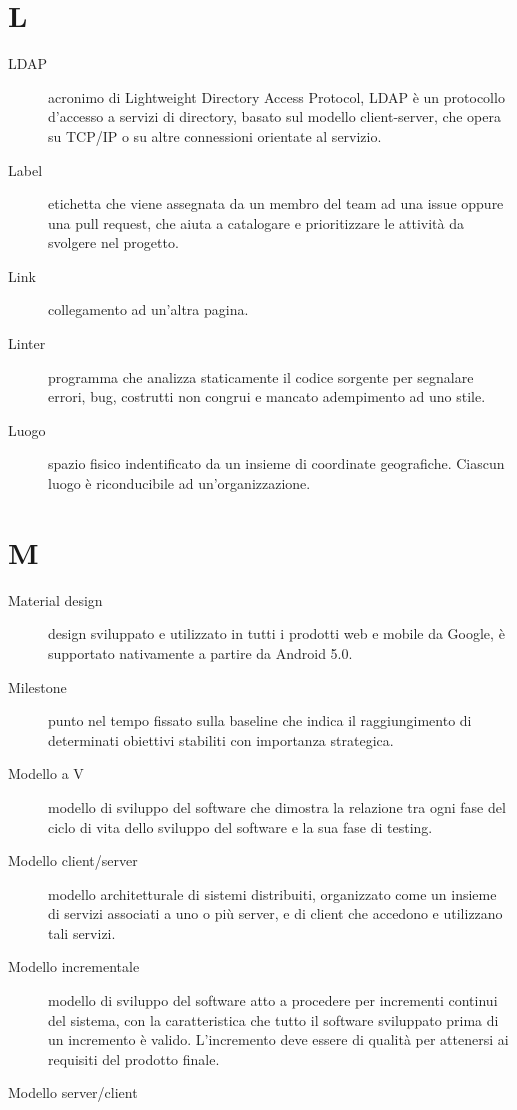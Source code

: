 \documentclass{article}
\begin{document}
\section{L}
\begin{description}
  \item[LDAP] acronimo di Lightweight Directory Access Protocol, LDAP è un protocollo d'accesso a servizi di directory, basato sul modello client-server, che opera su TCP/IP o su altre connessioni orientate al servizio.
  \item[Label] etichetta che viene assegnata da un membro del team ad una issue oppure una pull request, che aiuta a catalogare e prioritizzare le attività da svolgere nel progetto.
  \item[Link] collegamento ad un'altra pagina.
  \item[Linter] programma che analizza staticamente il codice sorgente per segnalare errori, bug, costrutti non congrui e mancato adempimento ad uno stile.
  \item[Luogo] spazio fisico indentificato da un insieme di coordinate geografiche. Ciascun luogo è riconducibile ad un'organizzazione.
\end{description}
\newpage
\section{M}
\begin{description}
  \item[Material design] design sviluppato e utilizzato in tutti i prodotti web e mobile da Google, è supportato nativamente a partire da Android 5.0.
  \item[Milestone] punto nel tempo fissato sulla baseline che indica il raggiungimento di determinati obiettivi stabiliti con importanza strategica.
  \item[Modello a V] modello di sviluppo del software che dimostra la relazione tra ogni fase del ciclo di vita dello sviluppo del software e la sua fase di testing.
  \item[Modello client/server] modello architetturale di sistemi distribuiti, organizzato come un insieme di servizi associati a uno o più server, e di client che accedono e utilizzano tali servizi.
  \item[Modello incrementale] modello di sviluppo del software atto a procedere per incrementi continui del sistema, con la caratteristica che tutto il software sviluppato prima di un incremento è valido. L'incremento deve essere di qualità per attenersi ai requisiti del prodotto finale.
  \item[Modello server/client] 
\end{description}
\newpage
\end{document}
